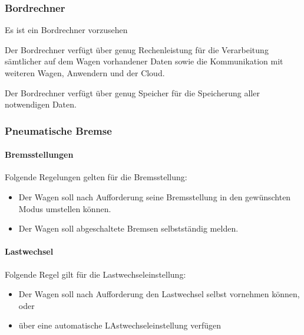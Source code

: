 \subsubsection{Bordrechner}
\begin{feat}
Es ist ein Bordrechner vorzusehen
\end{feat}
\begin{feat}
Der Bordrechner verfügt über genug Rechenleistung für die Verarbeitung sämtlicher auf dem Wagen vorhandener Daten sowie die Kommunikation mit weiteren Wagen, Anwendern und der Cloud.
\end{feat}
\begin{feat}
Der Bordrechner verfügt über genug Speicher für die Speicherung aller notwendigen Daten.
\end{feat}

\subsubsection{Pneumatische Bremse}
\paragraph{Bremsstellungen}
\begin{feat}
Folgende Regelungen gelten für die Bremsstellung:
\begin{itemize}
    \item Der Wagen soll nach Aufforderung seine Bremsstellung in den gewünschten Modus umstellen können.
    \item Der Wagen soll abgeschaltete Bremsen selbstständig melden.
\end{itemize}
\end{feat}

\paragraph{Lastwechsel}
\begin{feat}
Folgende Regel gilt für die Lastwechseleinstellung:
\begin{itemize}
    \item Der Wagen soll nach Aufforderung den Lastwechsel selbst vornehmen können, oder
    \item über eine automatische LAstwechseleinstellung verfügen
\end{itemize}
\end{feat}

